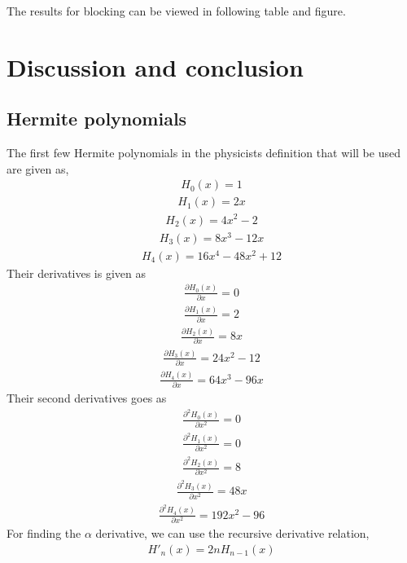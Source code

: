 \documentclass[11pt]{article}
\begin{document}
The results for blocking can be viewed in following table and figure.


\section{Discussion and conclusion}



\begin{appendices}
	\section{Hermite polynomials}
	The first few Hermite polynomials in the physicists definition that will be used are given as,
	\begin{align*}
		H_0(x) = 1
	\end{align*}
	\begin{align*}
		H_1(x) = 2x
	\end{align*}
	\begin{align*}
		H_2(x) = 4x^2 - 2
	\end{align*}
	\begin{align*}
		H_3(x) = 8x^3 - 12x
	\end{align*}
	\begin{align*}
		H_4(x) = 16x^4 - 48x^2 + 12
	\end{align*}
	Their derivatives is given as
	\begin{align*}
		\frac{\partial H_0(x)}{\partial x} = 0
	\end{align*}
	\begin{align*}
		\frac{\partial H_1(x)}{\partial x} = 2
	\end{align*}
	\begin{align*}
		\frac{\partial H_2(x)}{\partial x} = 8x
	\end{align*}
	\begin{align*}
		\frac{\partial H_3(x)}{\partial x} = 24x^2 - 12
	\end{align*}
	\begin{align*}
		\frac{\partial H_4(x)}{\partial x} = 64x^3 - 96x
	\end{align*}
	Their second derivatives goes as
	\begin{align*}
		\frac{\partial^2 H_0(x)}{\partial x^2} = 0
	\end{align*}
	\begin{align*}
		\frac{\partial^2 H_1(x)}{\partial x^2} = 0
	\end{align*}
	\begin{align*}
		\frac{\partial^2 H_2(x)}{\partial x^2} = 8
	\end{align*}
	\begin{align*}
		\frac{\partial^2 H_3(x)}{\partial x^2} = 48x
	\end{align*}
	\begin{align*}
		\frac{\partial^2 H_4(x)}{\partial x^2} = 192x^2 - 96
	\end{align*}
	For finding the $\alpha$ derivative, we can use the recursive derivative relation,
	\begin{align}
		H'_n(x) = 2nH_{n-1}(x)
		\label{eq:hermite-recursive-relation}
	\end{align}


\end{appendices}
\end{document}
